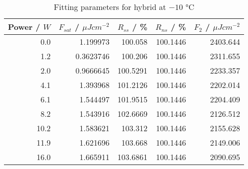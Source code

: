 \begin{table}[H]
\caption{Fitting parameters for hybrid at $-10$ °C}
\begin{tabular}{rrrrr}
\toprule
Power / $W$ & $F_{sat}$ / $\mu Jcm^{-2}$ & $R_{ss}$ / \% & $R_{ns}$ / \% & $F_2$ / $\mu Jcm^{-2}$ \\
\midrule
0.0 & 1.199973 & 100.058 & 100.1446 & 2403.644 \\
1.2 & 0.3623746 & 100.206 & 100.1446 & 2311.655 \\
2.0 & 0.9666645 & 100.5291 & 100.1446 & 2233.357 \\
4.1 & 1.393968 & 101.2126 & 100.1446 & 2202.014 \\
6.1 & 1.544497 & 101.9515 & 100.1446 & 2204.409 \\
8.2 & 1.543916 & 102.6669 & 100.1446 & 2126.512 \\
10.2 & 1.583621 & 103.312 & 100.1446 & 2155.628 \\
11.9 & 1.621696 & 103.668 & 100.1446 & 2149.006 \\
16.0 & 1.665911 & 103.6861 & 100.1446 & 2090.695 \\
\bottomrule
\end{tabular}
\end{table}

